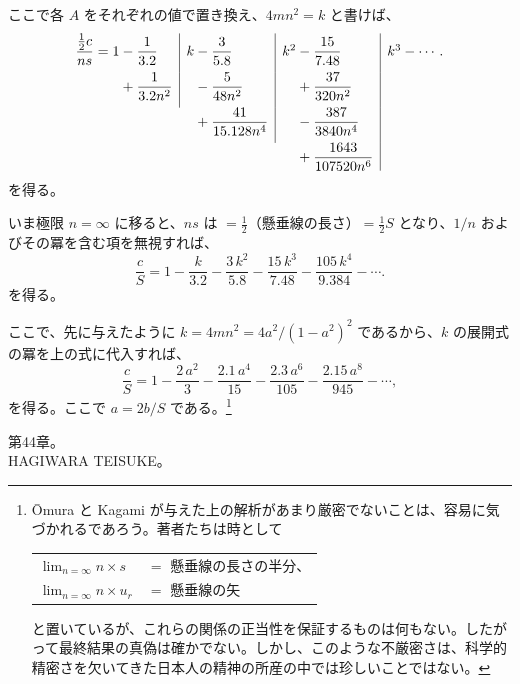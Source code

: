 \documentclass[11pt]{article}
\newcommand{\scanpage}[2]{\clearpage\setcounter{footnote}{0}\noindent{\footnotesize\color{gray}PDF #1 頁 · #2}\par\medskip}
\begin{document}
ここで各 $A$ をそれぞれの値で置き換え、$4mn^2 = k$ と書けば、
\[
\begin{array}{r@{}l|l@{}l|l@{}l|l}
\dfrac{\frac{1}{2}c}{ns} = 1 & {}- \dfrac{1}{3.2} & k & {}- \dfrac{3}{5.8} & k^2 & {}- \dfrac{15}{7.48} & k^3 - \cdots.\\[2ex]
 & {}+ \dfrac{1}{3.2n^2} & & {}- \dfrac{5}{48n^2} & & {}+ \dfrac{37}{320n^2} & \\[2ex]
 & \multicolumn{1}{l}{} & & {}+ \dfrac{41}{15.128n^4} & & {}- \dfrac{387}{3840n^4} & \\[2ex]
 & \multicolumn{1}{l}{} & & \multicolumn{1}{l}{} & & {}+ \dfrac{1643}{107520n^6} &
\end{array}
\]
を得る。

いま極限 $n = \infty$ に移ると、$ns$ は $= \frac{1}{2}$（懸垂線の長さ）$= \frac{1}{2}S$ となり、$1/n$ およびその冪を含む項を無視すれば、
\[
\frac{c}{S} = 1 - \frac{k}{3.2} - \frac{3\,k^2}{5.8} - \frac{15\,k^3}{7.48} - \frac{105\,k^4}{9.384} - \cdots.
\]
を得る。

ここで、先に与えたように $k = 4mn^2 = 4a^2/(1 - a^2)^2$ であるから、$k$ の展開式の冪を上の式に代入すれば、
\[
\frac{c}{S} = 1 - \frac{2\,a^2}{3} - \frac{2.1\,a^4}{15} - \frac{2.3\,a^6}{105} - \frac{2.15\,a^8}{945} - \cdots,
\]
を得る。ここで $a = 2b/S$ である。\footnote{Ōmura と Kagami が与えた上の解析があまり厳密でないことは、容易に気づかれるであろう。著者たちは時として
\begin{center}
\begin{tabular}{@{}l@{}l@{}}
$\lim_{n=\infty} n\times s$ & ${}={}$ 懸垂線の長さの半分、\\
$\lim_{n=\infty} n\times u_r$ & ${}={}$ 懸垂線の矢
\end{tabular}
\end{center}
と置いているが、これらの関係の正当性を保証するものは何もない。したがって最終結果の真偽は確かでない。しかし、このような不厳密さは、科学的精密さを欠いてきた日本人の精神の所産の中では珍しいことではない。}

\scanpage{0315}{印刷頁 301}
\begin{center}
第44章。\\[1mm]
HAGIWARA TEISUKE。
\end{center}
\end{document}

